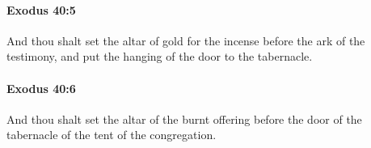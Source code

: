 		\paragraph{Exodus 40:5} %
			\label{EXODUS-40-5}

			And thou shalt set the altar of gold for the incense before the ark of the testimony, and put the hanging of the door to the tabernacle.


		\paragraph{Exodus 40:6} %
			\label{EXODUS-40-6}

			And thou shalt set the altar of the burnt offering before the door of the tabernacle of the tent of the congregation.


